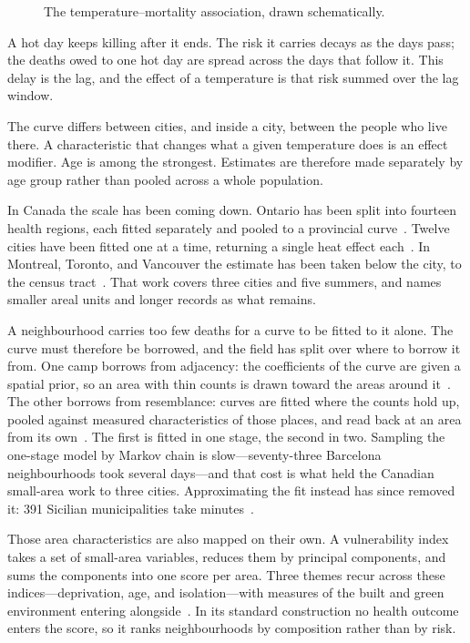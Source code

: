 \begin{figure}[ht]
\centering
\caption{The temperature--mortality association, drawn schematically.}
\label{fig:erf}
\end{figure}

A hot day keeps killing after it ends. The risk it carries decays as the
days pass; the deaths owed to one hot day are spread across the days that
follow it. This delay is the lag, and the effect of a temperature is that
risk summed over the lag window.

The curve differs between cities, and inside a city, between the people
who live there. A characteristic that changes what a given temperature
does is an effect modifier. Age is among the strongest. Estimates are
therefore made separately by age group rather than pooled across a whole
population.

In Canada the scale has been coming down. Ontario has been split into
fourteen health regions, each fitted separately and pooled to a provincial
curve~\citep{bai2017coronary}. Twelve cities have been fitted one at a
time, returning a single heat effect each~\citep{quick2024twelvecities}.
In Montreal, Toronto, and Vancouver the estimate has been taken below the
city, to the census tract~\citep{quick2025smallarea}. That work covers
three cities and five summers, and names smaller areal units and longer
records as what remains.

A neighbourhood carries too few deaths for a curve to be fitted to it
alone. The curve must therefore be borrowed, and the field has split over
where to borrow it from. One camp borrows from adjacency: the coefficients
of the curve are given a spatial prior, so an area with thin counts is
drawn toward the areas around it~\citep{quijalzamorano2024sbdlnm,
rutten2026spatialvarying,rutten2026effectmod,quick2025smallarea}. The
other borrows from resemblance: curves are fitted where the counts hold
up, pooled against measured characteristics of those places, and read back
at an area from its own~\citep{gasparrini2022smallarea,
masselot2025extensions,vazquez2025norway,dimaso2025italy}. The first is
fitted in one stage, the second in two. Sampling the one-stage model by
Markov chain is slow---seventy-three Barcelona neighbourhoods took
several days---and that cost is what held the Canadian small-area work
to three cities. Approximating the fit instead has since removed it:
391 Sicilian municipalities take
minutes~\citep{rutten2026spatialvarying}.

Those area characteristics are also mapped on their own. A vulnerability
index takes a set of small-area variables, reduces them by principal
components, and sums the components into one score per area. Three themes
recur across these indices---deprivation, age, and isolation---with
measures of the built and green environment entering
alongside~\citep{conlon2020hvipca,mallen2019dallas,sera2019urban,
gasparrini2022smallarea,quick2025smallarea}. In its standard construction
no health outcome enters the score, so it ranks neighbourhoods by
composition rather than by risk.

